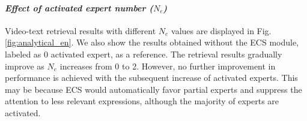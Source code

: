 \paragraph{\textit{Effect of activated expert number ($N_e$)}}
Video-text retrieval results with different $N_e$ values are displayed in Fig. \ref{fig:analytical_en}. We also show the results obtained without the ECS module, labeled as 0 activated expert, as a reference. The retrieval results gradually improve as $N_e$ increases from 0 to 2. 
However, no further improvement in performance is achieved with the subsequent increase of activated experts. This may be because ECS would automatically favor partial experts and suppress the attention to less relevant expressions, although the majority of experts are activated.

